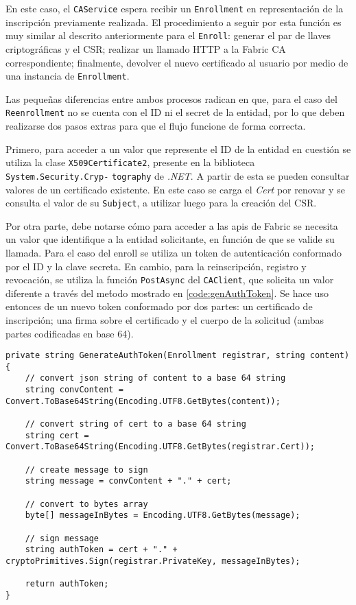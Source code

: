 En este caso, el \texttt{CAService} espera recibir un \texttt{Enrollment} en representaci\'on de la inscripci\'on previamente realizada. El procedimiento a seguir por esta funci\'on es muy similar al descrito anteriormente para el \texttt{Enroll}: generar el par de llaves criptogr\'aficas y el CSR; realizar un llamado HTTP a la Fabric CA correspondiente; finalmente, devolver el nuevo certificado al usuario por medio de una instancia de \texttt{Enrollment}.

Las peque\~nas diferencias entre ambos procesos radican en que, para el caso del \texttt{Reenrollment} no se cuenta con el ID ni el secret de la entidad, por lo que deben realizarse dos pasos extras para que el flujo funcione de forma correcta.

Primero, para acceder a un valor que represente el ID de la entidad en cuesti\'on se utiliza la clase \texttt{X509Certificate2}, presente en la biblioteca \texttt{System.Security.Cryp-} \texttt{tography} de \emph{.NET}. A partir de esta se pueden consultar valores de un certificado existente. En este caso se carga el \emph{Cert} por renovar y se consulta el valor de su \texttt{Subject}, a utilizar luego para la creaci\'on del CSR.

Por otra parte, debe notarse c\'omo para acceder a las apis de Fabric se necesita un valor que identifique a la entidad solicitante, en funci\'on de que se valide su llamada. Para el caso del enroll se utiliza un token de autenticaci\'on conformado por el ID y la clave secreta. En cambio, para la reinscripci\'on, registro y revocaci\'on, se utiliza la funci\'on \texttt{PostAsync} del \texttt{CAClient}, que solicita un valor diferente a trav\'es del me\'todo mostrado en \ref{code:genAuthToken}. Se hace uso entonces de un nuevo token conformado por dos partes: un certificado de inscripción; una firma sobre el certificado y el cuerpo de la solicitud (ambas partes codificadas en base 64).

\begin{lstlisting}[caption={M\'etodo \texttt{GenerateAuthToken} de la clase \texttt{CAClient}.}, label={code:genAuthToken}]
private string GenerateAuthToken(Enrollment registrar, string content) {
	// convert json string of content to a base 64 string
	string convContent = Convert.ToBase64String(Encoding.UTF8.GetBytes(content));

	// convert string of cert to a base 64 string
	string cert = Convert.ToBase64String(Encoding.UTF8.GetBytes(registrar.Cert));

	// create message to sign
	string message = convContent + "." + cert;

	// convert to bytes array
	byte[] messageInBytes = Encoding.UTF8.GetBytes(message);

	// sign message
	string authToken = cert + "." + cryptoPrimitives.Sign(registrar.PrivateKey, messageInBytes);

	return authToken;
}
\end{lstlisting}

